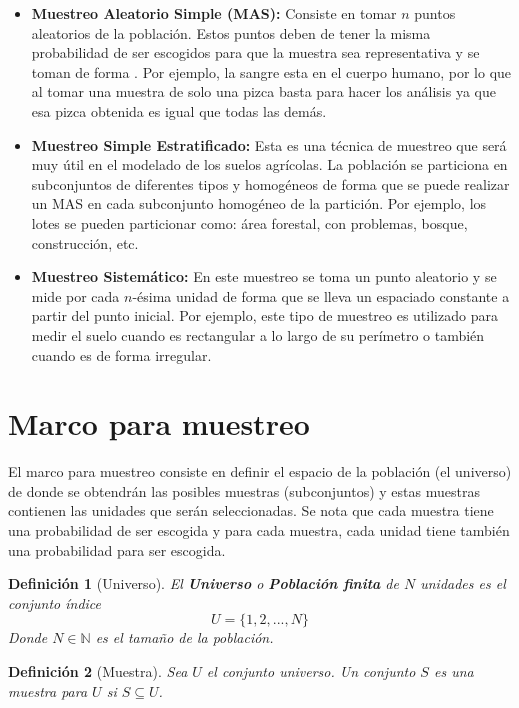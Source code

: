 \documentclass{report}
\newtheorem{definition}{Definición}
\begin{document}
\begin{itemize}
    \item \textbf{Muestreo Aleatorio Simple (MAS):} Consiste en tomar $n$ puntos aleatorios de la población. Estos puntos deben de tener la misma probabilidad de ser escogidos para que la muestra sea representativa y se toman de forma . Por ejemplo, la sangre esta  en el cuerpo humano, por lo que al tomar una muestra de solo una pizca basta para hacer los análisis ya que esa pizca obtenida es igual que todas las demás.
    
    \item \textbf{Muestreo Simple Estratificado:} Esta es una técnica de muestreo que será muy útil en el modelado de los suelos agrícolas. La población se particiona en subconjuntos de diferentes tipos y homogéneos de forma que se puede realizar un MAS en cada subconjunto homogéneo de la partición. Por ejemplo, los lotes se pueden particionar como: área forestal, con problemas, bosque, construcción, etc.
    
    \item \textbf{Muestreo Sistemático:} En este muestreo se toma un punto aleatorio y se mide por cada $n$-ésima unidad de forma que se lleva un espaciado constante a partir del punto inicial. Por ejemplo, este tipo de muestreo es utilizado para medir el suelo cuando es rectangular a lo largo de su perímetro o también cuando es de forma irregular.
\end{itemize}

\section{Marco para muestreo}

El marco para muestreo \cite{lohr-2009} consiste en definir el espacio de la población (el universo) de donde se obtendrán las posibles muestras (subconjuntos) y estas muestras contienen las unidades que serán seleccionadas. Se nota que cada muestra tiene una probabilidad de ser escogida y para cada muestra, cada unidad tiene también una probabilidad para ser escogida.

\begin{definition}[Universo]
    El \textbf{Universo} o \textbf{Población finita} de $N$ unidades es el conjunto índice
    $$
    U = \{ 1, 2, ..., N \}
    $$
    Donde $N \in \mathbb{N}$ es el tamaño de la población.
\end{definition}

\begin{definition}[Muestra]
    Sea $U$ el conjunto universo. Un conjunto $S$ es una muestra para $U$ si $S \subseteq U$.
\end{definition}
\end{document}

